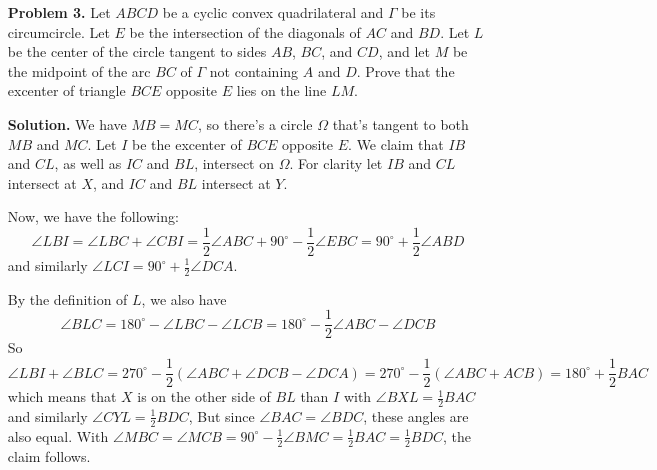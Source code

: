 \documentclass[11pt,a4paper]{article}
\begin{document}
\begin{enumerate}
	\item [\textbf{Problem 3.}] Let $ABCD$ be a cyclic convex quadrilateral and $\Gamma$ be its circumcircle. Let $E$ be the intersection of the diagonals of $AC$ and $BD$. Let $L$ be the center of the circle tangent to sides $AB$, $BC$, and $CD$, and let $M$ be the midpoint of the arc $BC$ of $\Gamma$ not containing $A$ and $D$. Prove that the excenter of triangle $BCE$ opposite $E$ lies on the line $LM$.
	
	\textbf{Solution.} We have $MB=MC$, so there's a circle $\Omega$ that's tangent to both $MB$ and $MC$. Let $I$ be the excenter of $BCE$ opposite $E$. We claim that $IB$ and $CL$, as well as $IC$ and $BL$, intersect on $\Omega$. For clarity let $IB$ and $CL$ intersect at $X$, and $IC$ and $BL$ intersect at $Y$. 
	
	Now, we have the following: 
	\[
	\angle LBI = \angle LBC + \angle CBI = \frac 12 \angle ABC + 90^{\circ}-\frac 12 \angle EBC = 90^{\circ}+\frac 12 \angle ABD
	\]
	and similarly $\angle LCI = 90^{\circ}+\frac 12\angle DCA$. 
	
	By the definition of $L$, we also have 
	\[
	\angle BLC=180^{\circ}-\angle LBC-\angle LCB = 180^{\circ} - \frac 12 \angle ABC-\angle DCB
	\]
	So 
	\[
	\angle LBI+\angle BLC=270^{\circ} - \frac 12 (\angle ABC+\angle DCB-\angle DCA)=270^{\circ} - \frac 12(\angle ABC+ACB)=180^{\circ}+\frac 12 BAC
	\]
	which means that $X$ is on the other side of $BL$ than $I$ with $\angle BXL=\frac 12 BAC$ and similarly $\angle CYL=\frac 12 BDC$, But since $\angle BAC=\angle BDC$, these angles are also equal. With $\angle MBC=\angle MCB=90^{\circ}-\frac 12 \angle BMC=\frac 12 BAC=\frac 12 BDC$, the claim follows. 


\end{enumerate}
\end{document}
